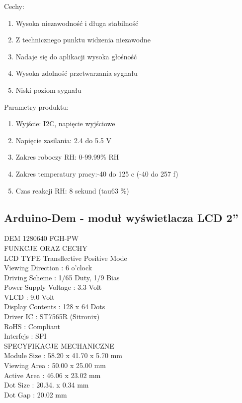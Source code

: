 \documentclass{classrep}
\begin{document}
Cechy:
\begin{enumerate}
  \item Wysoka niezawodność i długa stabilność
  \item Z technicznego punktu widzenia niezawodne
  \item Nadaje się do aplikacji wysoka głośność
  \item Wysoka zdolność przetwarzania sygnału
  \item Niski poziom sygnału\\
\end{enumerate}


Parametry produktu:
\begin{enumerate}
  \item Wyjście: I2C, napięcie wyjściowe
  \item Napięcie zasilania: 2.4 do 5.5 V
  \item Zakres roboczy RH: 0-99.99\% RH
  \item Zakres temperatury pracy:-40 \degree do 125 \degree c (-40 \degree do 257 \degree f)
  \item Czas reakcji RH: 8 sekund (tau63 \%)
\end{enumerate}


\subsection {Arduino-Dem - moduł wyświetlacza LCD 2''}
DEM 1280640 FGH-PW\\

FUNKCJE ORAZ CECHY\\
LCD TYPE
Transflective Positive Mode\\
Viewing Direction           : 6 o'clock\\
 Driving Scheme           : 1/65 Duty, 1/9 Bias\\
 Power Supply Voltage   : 3.3 Volt\\
 VLCD                        : 9.0 Volt\\
 Display Contents         : 128 x 64 Dots\\
 Driver IC                   : ST7565R (Sitronix)\\
 RoHS                        : Compliant\\
 Interfejs                    : SPI\\

SPECYFIKACJE MECHANICZNE\\
Module Size   	:  58.20 x 41.70 x 5.70 mm\\
Viewing Area 	:  50.00 x 25.00 mm\\
Active Area 	:  46.06 x 23.02 mm\\
Dot Size		: 20.34. x 0.34 mm\\
Dot Gap 		: 20.02 mm\\
\end{document}
